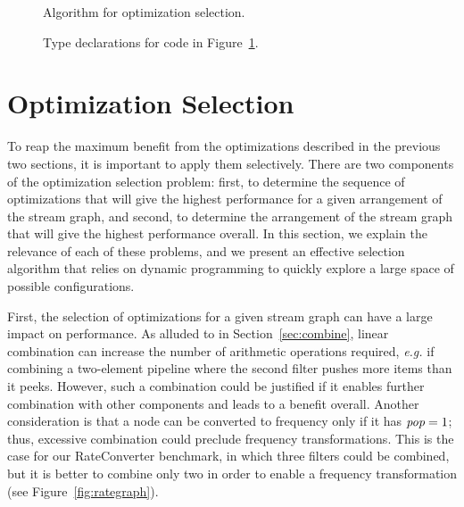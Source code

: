 \begin{figure}[t]
  \caption{Algorithm for optimization selection.
  \protect\label{fig:part-alg}}
\end{figure}

\begin{figure}[t]
  \caption{Type declarations for code in Figure~\ref{fig:part-alg}.}
\end{figure}


\section{Optimization Selection}
\label{sec:partitioning}

To reap the maximum benefit from the optimizations described in the
previous two sections, it is important to apply them selectively.
There are two components of the optimization selection problem: first,
to determine the sequence of optimizations that will give the highest
performance for a given arrangement of the stream graph, and second,
to determine the arrangement of the stream graph that will give the
highest performance overall.  In this section, we explain the
relevance of each of these problems, and we present an effective
selection algorithm that relies on dynamic programming to quickly
explore a large space of possible configurations.

First, the selection of optimizations for a given stream graph can
have a large impact on performance.  As alluded to in
Section~\ref{sec:combine}, linear combination can increase the number
of arithmetic operations required, {\it e.g.} if combining a
two-element pipeline where the second filter pushes more items than it
peeks.  However, such a combination could be justified if it enables
further combination with other components and leads to a benefit
overall.  Another consideration is that a node can be converted to
frequency only if it has $\mbox{\it pop}=1$; thus, excessive combination
could preclude frequency transformations.  This is the case for our
RateConverter benchmark, in which three filters could be combined, but
it is better to combine only two in order to enable a frequency
transformation (see Figure~\ref{fig:rategraph}).

